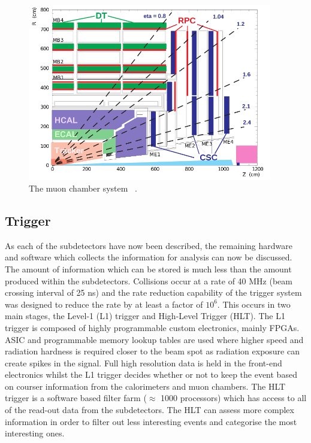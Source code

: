 \begin{figure}[ht!]
\centering
    \includegraphics[width=0.95\textwidth]{images/MuonChambers.png}
    \caption{The muon chamber system ~\cite{Kim:2012ix}.}
    \label{fig:muonchamber}
\end{figure}

\subsection{Trigger \label{det:trigger}}
As each of the subdetectors have now been described, the remaining hardware and software which collects the information for analysis can now be discussed. The amount of information which can be stored is much less than the amount produced within the subdetectors. Collisions occur at a rate of 40 MHz (beam crossing interval of 25 ns) and the rate reduction capability of the trigger system was designed to reduce the rate by at least a factor of $10^6$. This occurs in two main stages, the Level-1 (L1) trigger and High-Level Trigger (HLT). The L1 trigger is composed of highly programmable custom electronics, mainly FPGAs. ASIC and programmable memory lookup tables are used where higher speed and radiation hardness is required closer to the beam spot as radiation exposure can create spikes in the signal. Full high resolution data is held in the front-end electronics whilst the L1 trigger decides whether or not to keep the event based on courser information from the calorimeters and muon chambers. The HLT trigger is a software based filter farm ($\approx$ 1000 processors) which has access to all of the read-out data from the subdetectors. The HLT can assess more complex information in order to filter out less interesting events and categorise the most interesting ones.

